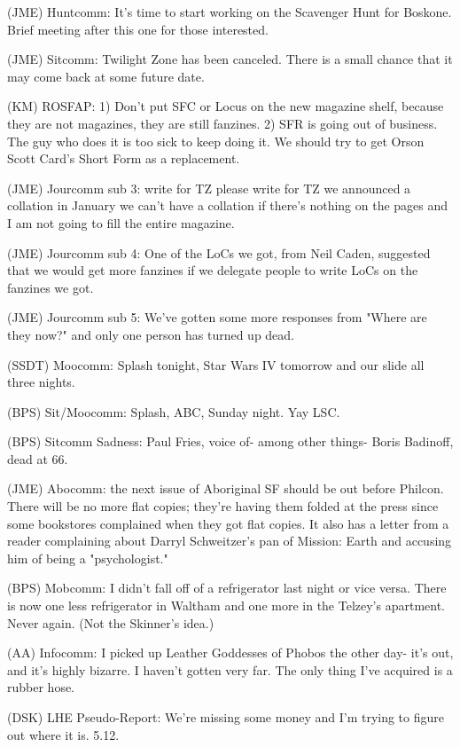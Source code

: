 \documentclass[12pt]{article}
\begin{document}
(JME) Huntcomm: It's time to start working on the Scavenger Hunt for Boskone. Brief meeting after this one for those interested.

(JME) Sitcomm: Twilight Zone has been canceled. There is a small chance that it may come back at some future date.

(KM) ROSFAP: 1) Don't put SFC or Locus on the new magazine shelf, because they are not magazines, they are still fanzines. 2) SFR is going out of business. The guy who does it is too sick to keep doing it. We should try to get Orson Scott Card's Short Form as a replacement.

(JME) Jourcomm sub 3: write for TZ please write for TZ we announced a collation in January we can't have a collation if there's nothing on the pages and I am not going to fill the entire magazine.

(JME) Jourcomm sub 4: One of the LoCs we got, from Neil Caden, suggested that we would get more fanzines if we delegate people to write LoCs on the fanzines we got.

(JME) Jourcomm sub 5: We've gotten some more responses from "Where are they now?" and only one person has turned up dead.

(SSDT) Moocomm: Splash tonight, Star Wars IV tomorrow and our slide all three nights.

(BPS) Sit/Moocomm: Splash, ABC, Sunday night. Yay LSC.

(BPS) Sitcomm Sadness: Paul Fries, voice of- among other things- Boris Badinoff, dead at 66.

(JME) Abocomm: the next issue of Aboriginal SF should be out before Philcon. There will be no more flat copies; they're having them folded at the press since some bookstores complained when they got flat copies. It also has a letter from a reader complaining about Darryl Schweitzer's pan of Mission: Earth and accusing him of being a "psychologist."

(BPS) Mobcomm: I didn't fall off of a refrigerator last night or vice versa. There is now one less refrigerator in Waltham and one more in the Telzey's apartment. Never again. (Not the Skinner's idea.)

(AA) Infocomm: I picked up Leather Goddesses of Phobos the other day- it's out, and it's highly bizarre. I haven't gotten very far. The only thing I've acquired is a rubber hose.

(DSK) LHE Pseudo-Report: We're missing some money and I'm trying to figure out where it is. 5.12.
\end{document}
